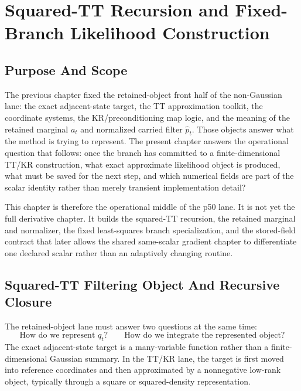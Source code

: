 \chapter{Squared-TT Recursion and Fixed-Branch Likelihood Construction}
\label{ch:bf-highdim-squared-tt-fixed-branch-likelihoods}

\section{Purpose And Scope}
\label{sec:bf-hd-squared-tt-purpose}

The previous chapter fixed the retained-object front half of the non-Gaussian
lane: the exact adjacent-state target, the TT approximation toolkit, the
coordinate systems, the KR/preconditioning map logic, and the meaning of the
retained marginal \(a_t\) and normalized carried filter \(\widehat p_t\).
Those objects answer what the method is trying to represent.  The present chapter
answers the operational question that follows: once the branch has committed to a
finite-dimensional TT/KR construction, what exact approximate likelihood object
is produced, what must be saved for the next step, and which numerical fields are
part of the scalar identity rather than merely transient implementation detail?

This chapter is therefore the operational middle of the p50 lane.  It is not yet
the full derivative chapter.  It builds the squared-TT recursion, the retained
marginal and normalizer, the fixed least-squares branch specialization, and the
stored-field contract that later allows the shared same-scalar gradient chapter
to differentiate one declared scalar rather than an adaptively changing routine.

\section{Squared-TT Filtering Object And Recursive Closure}
\label{sec:bf-hd-squared-tt-closure}

The retained-object lane must answer two questions at the same time:
\begin{equation}
  \text{How do we represent } q_t?
  \qquad
  \text{How do we integrate the represented object?}
  \label{eq:bf-hd-squared-tt-two-questions}
\end{equation}
The exact adjacent-state target is a many-variable function rather than a
finite-dimensional Gaussian summary.  In the TT/KR lane, the target is first
moved into reference coordinates and then approximated by a nonnegative
low-rank object, typically through a square or squared-density representation.

